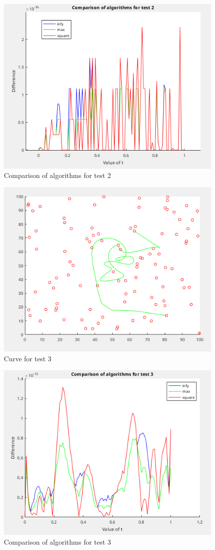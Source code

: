 \documentclass[]{article}
\begin{document}
\begin{figure}
  \centering
  \includegraphics[width=0.8\linewidth]{figs/02-diffs.png}
  \caption{Comparison of algorithms for test 2}
  \label{fig:02-diffs}
\end{figure}

\begin{figure}
  \centering
  \includegraphics[width=0.8\linewidth]{figs/03-curve.png}
  \caption{Curve for test 3}
  \label{fig:03-curve}
\end{figure}

\begin{figure}
	\centering
	\includegraphics[width=0.8\linewidth]{figs/03-diffs.png}
	\caption{Comparison of algorithms for test 3}
	\label{fig:03-diffs}
\end{figure}
\end{document}
